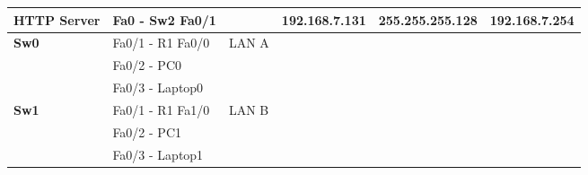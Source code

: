 \documentclass[11pt,a4paper]{report}
\begin{document}
\begin{center}
\begin{longtable}{@{}llllll@{}}
\textbf{HTTP Server}                               & Fa0 - Sw2 Fa0/1                                          &                                                       & 192.168.7.131                                    & 255.255.255.128                                           & 192.168.7.254                                         \\* \midrule
\multirow{3}{*}{\textbf{Sw0}}                      & Fa0/1 - R1 Fa0/0                                         & \multirow{3}{*}{LAN A}                                & \multicolumn{1}{c}{}                             & \multicolumn{1}{c}{}                                      & \multicolumn{1}{c}{}                                  \\
                                                   & Fa0/2 - PC0                                              &                                                       & \multicolumn{1}{c}{}                             & \multicolumn{1}{c}{}                                      & \multicolumn{1}{c}{}                                  \\
                                                   & Fa0/3 - Laptop0                                          &                                                       & \multicolumn{1}{c}{}                             & \multicolumn{1}{c}{}                                      & \multicolumn{1}{c}{}                                  \\* \midrule
\multirow{3}{*}{\textbf{Sw1}}                      & Fa0/1 - R1 Fa1/0                                         & \multirow{3}{*}{LAN B}                                & \multicolumn{1}{c}{}                             & \multicolumn{1}{c}{}                                      & \multicolumn{1}{c}{}                                  \\
                                                   & Fa0/2 - PC1                                              &                                                       & \multicolumn{1}{c}{}                             & \multicolumn{1}{c}{}                                      & \multicolumn{1}{c}{}                                  \\
                                                   & Fa0/3 - Laptop1                                          &                                                       & \multicolumn{1}{c}{}                             & \multicolumn{1}{c}{}                                      & \multicolumn{1}{c}{}                                  \\* \midrule

\end{longtable}
\end{center}
\end{document}
